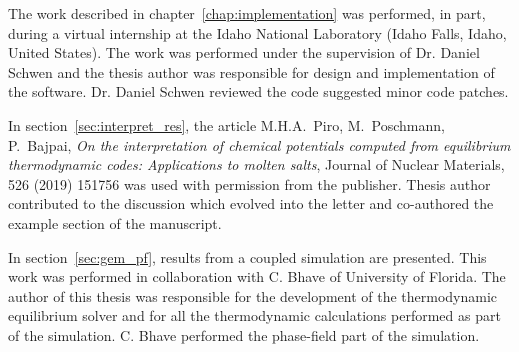 The work described in chapter~\ref{chap:implementation} was performed, in part, during a virtual internship at the Idaho National Laboratory (Idaho Falls, Idaho, United States). The work was performed under the supervision of Dr. Daniel Schwen and the thesis author was responsible for design and implementation of the software. Dr. Daniel Schwen reviewed the code suggested minor code patches.

In section~\ref{sec:interpret_res}, the article {M.H.A.\ Piro}, {M.\ Poschmann}, {P.\ Bajpai}, \textit{On the interpretation of chemical potentials computed from equilibrium thermodynamic codes: Applications to molten salts}, {Journal of Nuclear Materials, 526 (2019) 151756} was used with permission from the publisher. Thesis author contributed to the discussion which evolved into the letter and co-authored the example section of the manuscript.

In section~\ref{sec:gem_pf}, results from a coupled simulation are presented. This work was performed in collaboration with C. Bhave of University of Florida. The author of this thesis was responsible for the development of the thermodynamic equilibrium solver and for all the thermodynamic calculations performed as part of the simulation. C. Bhave performed the phase-field part of the simulation.